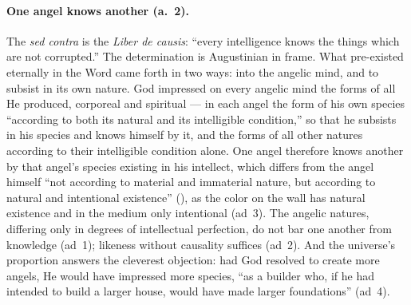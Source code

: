 \paragraph{One angel knows another (a.~2).} The \emph{sed contra} is the
\emph{Liber de causis}: ``every intelligence knows the things which are
not corrupted.'' The determination is Augustinian in frame. What
pre-existed eternally in the Word came forth in two ways: into the angelic
mind, and to subsist in its own nature. God impressed on every angelic
mind the forms of all He produced, corporeal and spiritual --- in each
angel the form of his own species ``according to both its natural and its
intelligible condition,'' so that he subsists in his species and knows
himself by it, and the forms of all other natures according to their
intelligible condition alone. One angel therefore knows another by that
angel's species existing in his intellect, which differs from the angel
himself ``not according to material and immaterial nature, but according
to natural and intentional existence'' (), as the
color on the wall has natural existence and in the medium only intentional
(ad~3). The angelic natures, differing only in degrees of intellectual
perfection, do not bar one another from knowledge (ad~1); likeness without
causality suffices (ad~2). And the universe's proportion answers the
cleverest objection: had God resolved to create more angels, He would have
impressed more species, ``as a builder who, if he had intended to build a
larger house, would have made larger foundations'' (ad~4).

